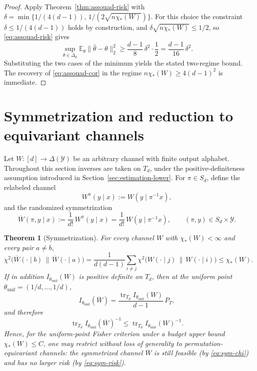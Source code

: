 \documentclass[11pt]{amsart}
\numberwithin{equation}{section}
\newtheorem{theorem}{Theorem}[section]
\theoremstyle{definition}
\newcommand{\E}{\mathbb E}
\begin{document}
\begin{proof}
Apply Theorem~\ref{thm:assouad-risk} with
\(
\delta=\min\{1/(4(d-1)),\,1/(2\sqrt{n\chi_\ast(W)})\}
\).
For this choice the constraint \(\delta\le 1/(4(d-1))\) holds by construction, and
\(
\delta\sqrt{n\chi_\ast(W)}\le 1/2
\),
so \eqref{eq:assouad-risk} gives
\[
\sup_{\theta\in\Delta_d}\E_\theta\|\widehat\theta-\theta\|_2^2
\ge
\frac{d-1}{8}\,\delta^2\cdot\frac12
=
\frac{d-1}{16}\,\delta^2.
\]
Substituting the two cases of the minimum yields the stated two-regime bound.
The recovery of \eqref{eq:assouad-cor} in the regime \(n\chi_\ast(W)\ge 4(d-1)^2\)
is immediate.
\end{proof}

\section{Symmetrization and reduction to equivariant channels}\label{sec:symmetrization}

Let \(W:[d]\to\Delta(\mathcal Y)\) be an arbitrary channel with finite output alphabet.
Throughout this section inverses are taken on \(T_d\), under the positive-definiteness assumption
introduced in Section~\ref{sec:estimation-lower}.
For \(\pi\in S_d\), define the relabeled channel
\[
W^\pi(y\mid x):=W(y\mid \pi^{-1}x),
\]
and the randomized symmetrization
\[
\overline W(\pi,y\mid x):=\frac{1}{d!}\,W^\pi(y\mid x)
=\frac{1}{d!}\,W(y\mid \pi^{-1}x),
\qquad
(\pi,y)\in S_d\times \mathcal Y.
\]

\begin{theorem}[Symmetrization]\label{thm:symmetrization}
For every channel \(W\) with \(\chi_\ast(W)<\infty\) and every pair \(a\neq b\),
\[
\chi^2\!\bigl(\overline W(\cdot\mid b)\,\|\,\overline W(\cdot\mid a)\bigr)
=
\frac{1}{d(d-1)}\sum_{i\neq j}\chi^2\!\bigl(W(\cdot\mid j)\,\|\,W(\cdot\mid i)\bigr)
\le
\chi_\ast(W). \tag{9.1}\label{eq:sym-chi}
\]
If in addition \(I_{\theta_{\mathrm{unif}}}(W)\) is positive definite on \(T_d\),
then at the uniform point \(\theta_{\mathrm{unif}}=(1/d,\dots,1/d)\),
\[
I_{\theta_{\mathrm{unif}}}(\overline W)
=
\frac{\operatorname{tr}_{T_d} I_{\theta_{\mathrm{unif}}}(W)}{d-1}\,P_T, \tag{9.2}\label{eq:sym-fisher}
\]
and therefore
\[
\operatorname{tr}_{T_d} I_{\theta_{\mathrm{unif}}}(\overline W)^{-1}
\le
\operatorname{tr}_{T_d} I_{\theta_{\mathrm{unif}}}(W)^{-1}. \tag{9.3}\label{eq:sym-risk}
\]
Hence, for the uniform-point Fisher criterion under a budget upper bound
\(\chi_\ast(W)\le C\), one may restrict without loss of generality to
permutation-equivariant channels: the symmetrized channel \(\overline W\) is still feasible
(by \eqref{eq:sym-chi}) and has no larger risk (by \eqref{eq:sym-risk}).
\end{theorem}
\end{document}
